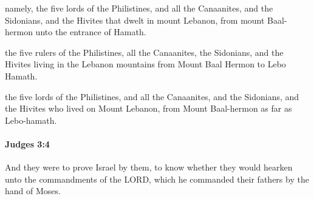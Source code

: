 			\begin{versebox}
					\item[BHS] 
					\item[ASV] namely, the five lords of the Philistines, and all the Canaanites, and the Sidonians, and the Hivites that dwelt in mount Lebanon, from mount Baal-hermon unto the entrance of Hamath.
					\item[NIV] the five rulers of the Philistines, all the Canaanites, the Sidonians, and the Hivites living in the Lebanon mountains from Mount Baal Hermon to Lebo Hamath.
					\item[NRSV] the five lords of the Philistines, and all the Canaanites, and the Sidonians, and the Hivites who lived on Mount Lebanon, from Mount Baal-hermon as far as Lebo-hamath.
			\end{versebox}

		\paragraph{Judges 3:4} %
			\label{JUDGES-3-4}

			And they were to prove Israel by them, to know whether they would hearken unto the commandments of the LORD, which he commanded their fathers by the hand of Moses.

